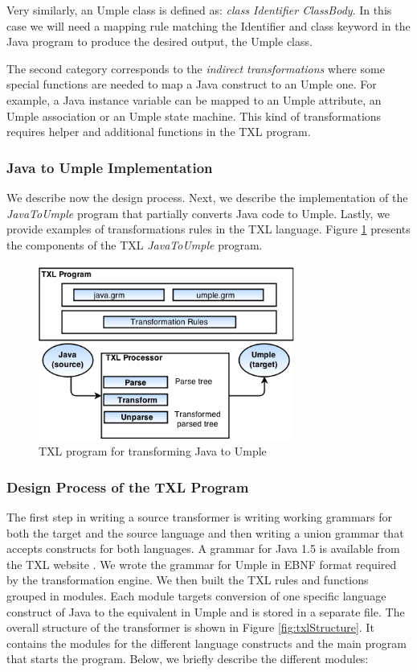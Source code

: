 Very similarly, an Umple class is defined as: \textit{class Identifier ClassBody}. In this case we will need a mapping rule matching the Identifier and class keyword in the Java program to produce the desired output, the Umple class. 

The second category corresponds to the \textit{indirect transformations} where some special functions are needed to map a Java construct to an Umple one. For example, a Java instance variable can be mapped to an Umple attribute, an Umple association or an Umple state machine. This kind of transformations requires helper and additional functions in the TXL program. 

\subsubsection{Java to Umple Implementation}

We describe now the design process. Next, we describe the implementation of the \textit{JavaToUmple} program that partially converts Java code to Umple. Lastly, we provide examples of transformations rules in the TXL language. Figure \ref{fig:txl} presents the components of the TXL \textit{JavaToUmple} program. 

\begin{figure}[h]
\centering
\includegraphics[width=0.75\textwidth]{Figures/TXLprogram.png} 
\caption{TXL program for transforming Java to Umple}
\label{fig:txl}
\end{figure}

\subsubsection{Design Process of the TXL Program}

The first step in writing a source transformer is writing working grammars for both the target and the source language and then writing a union grammar that accepts constructs for both languages. A grammar for Java 1.5 is available from the TXL website \cite{txlresources}. We wrote the grammar for Umple in EBNF format required by the transformation engine. We then built the TXL rules and functions grouped in modules. Each module targets conversion of one specific language construct of Java to the equivalent in Umple and is stored in a separate file. The overall structure of the transformer is shown in Figure \ref{fig:txlStructure}. It contains the modules for the different language constructs and the main program that starts the program. Below, we briefly describe the different modules:

